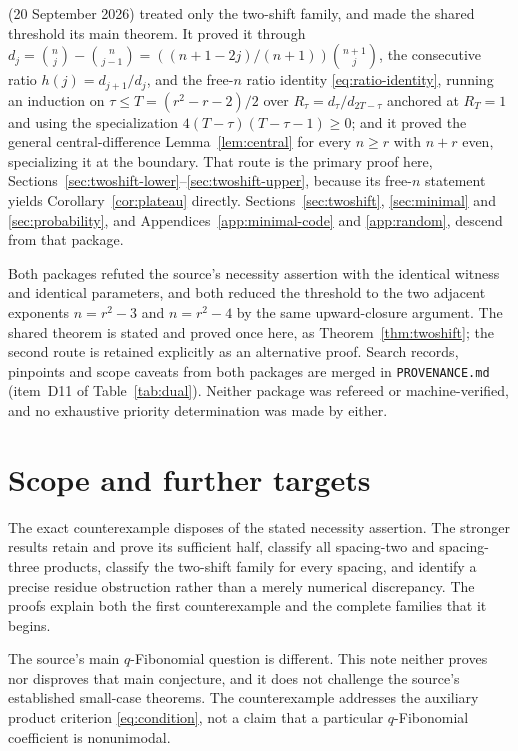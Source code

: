 \documentclass[11pt]{article}
\theoremstyle{research}
\theoremstyle{definition}
\numberwithin{equation}{section}
\begin{document}
(20 September 2026) treated only the two-shift family, and made the shared
threshold its main theorem. It proved it through
$d_j=\binom nj-\binom n{j-1}=((n+1-2j)/(n+1))\binom{n+1}{j}$, the
consecutive ratio $h(j)=d_{j+1}/d_j$, and the free-$n$ ratio identity
\eqref{eq:ratio-identity}, running an induction on $\tau\le T=(r^2-r-2)/2$
over $R_\tau=d_\tau/d_{2T-\tau}$ anchored at $R_T=1$ and using the
specialization $4(T-\tau)(T-\tau-1)\ge0$; and it proved the general
central-difference Lemma~\ref{lem:central} for every $n\ge r$ with $n+r$
even, specializing it at the boundary. That route is the primary proof
here, Sections~\ref{sec:twoshift-lower}--\ref{sec:twoshift-upper}, because
its free-$n$ statement yields Corollary~\ref{cor:plateau} directly.
Sections~\ref{sec:twoshift}, \ref{sec:minimal} and \ref{sec:probability},
and Appendices~\ref{app:minimal-code} and \ref{app:random}, descend from
that package.

Both packages refuted the source's necessity assertion with the identical
witness and identical parameters, and both reduced the threshold to the
two adjacent exponents $n=r^2-3$ and $n=r^2-4$ by the same upward-closure
argument. The shared theorem is stated and proved once here, as
Theorem~\ref{thm:twoshift}; the second route is retained explicitly as an
alternative proof. Search records, pinpoints and scope caveats from both
packages are merged in \texttt{PROVENANCE.md} (item~D11 of
Table~\ref{tab:dual}). Neither package was refereed
or machine-verified, and no exhaustive priority determination was made by
either.

\section{Scope and further targets}
\label{sec:scope}
The exact counterexample disposes of the stated necessity assertion.
The stronger results retain and prove its sufficient half, classify all
spacing-two and spacing-three products, classify the two-shift family for
every spacing, and identify a precise residue obstruction rather than a
merely numerical discrepancy. The proofs explain both the first
counterexample and the complete families that it begins.

The source's main $q$-Fibonomial question is different. This note neither
proves nor disproves that main conjecture, and it does not challenge the
source's established small-case theorems. The counterexample addresses the
auxiliary product criterion \eqref{eq:condition}, not a claim that a
particular $q$-Fibonomial coefficient is nonunimodal.
\end{document}
